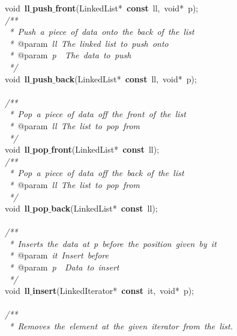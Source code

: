 \documentclass{article}
\begin{document}
\mbox{}void\ \textbf{ll$\_$push$\_$front}(LinkedList*\ \textbf{const}\ ll,\ void*\ p); \\
\mbox{}\textit{/**} \\
\mbox{}\textit{\ *\ Push\ a\ piece\ of\ data\ onto\ the\ back\ of\ the\ list} \\
\mbox{}\textit{\ *\ }@param\textit{\ ll\ The\ linked\ list\ to\ push\ onto} \\
\mbox{}\textit{\ *\ }@param\textit{\ p\ \ The\ data\ to\ push} \\
\mbox{}\textit{\ */} \\
\mbox{}void\ \textbf{ll$\_$push$\_$back}(LinkedList*\ \textbf{const}\ ll,\ void*\ p); \\
\mbox{} \\
\mbox{}\textit{/**} \\
\mbox{}\textit{\ *\ Pop\ a\ piece\ of\ data\ off\ the\ front\ of\ the\ list} \\
\mbox{}\textit{\ *\ }@param\textit{\ ll\ The\ list\ to\ pop\ from} \\
\mbox{}\textit{\ */} \\
\mbox{}void\ \textbf{ll$\_$pop$\_$front}(LinkedList*\ \textbf{const}\ ll); \\
\mbox{}\textit{/**} \\
\mbox{}\textit{\ *\ Pop\ a\ piece\ of\ data\ off\ the\ back\ of\ the\ list} \\
\mbox{}\textit{\ *\ }@param\textit{\ ll\ The\ list\ to\ pop\ from} \\
\mbox{}\textit{\ */} \\
\mbox{}void\ \textbf{ll$\_$pop$\_$back}(LinkedList*\ \textbf{const}\ ll); \\
\mbox{} \\
\mbox{}\textit{/**} \\
\mbox{}\textit{\ *\ Inserts\ the\ data\ at\ p\ before\ the\ position\ given\ by\ it} \\
\mbox{}\textit{\ *\ }@param\textit{\ it\ Insert\ before} \\
\mbox{}\textit{\ *\ }@param\textit{\ p\ \ Data\ to\ insert} \\
\mbox{}\textit{\ */} \\
\mbox{}void\ \textbf{ll$\_$insert}(LinkedIterator*\ \textbf{const}\ it,\ void*\ p); \\
\mbox{} \\
\mbox{}\textit{/**} \\
\mbox{}\textit{\ *\ Removes\ the\ element\ at\ the\ given\ iterator\ from\ the\ list.} \\
\end{document}

